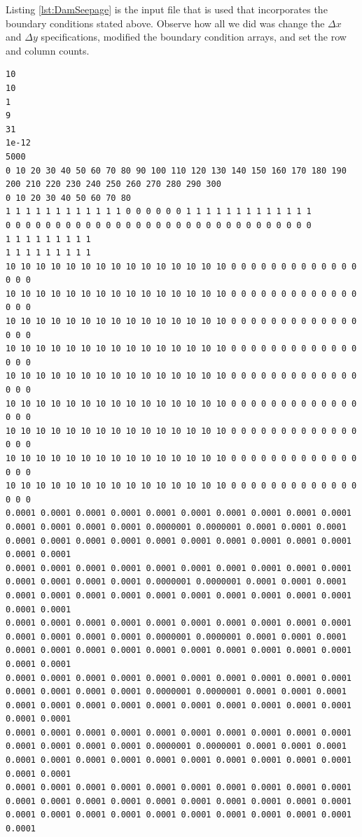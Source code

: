 Listing \ref{lst:DamSeepage} is the input file that is used that incorporates the boundary conditions stated above.   
Observe how all we did was change the $\Delta x$ and $\Delta y$ specifications, modified the boundary condition arrays, and set the row and column counts.
\begin{lstlisting}[caption= Input file for 2D vertical slice for Dam Seepage Example , label=lst:DamSeepage]
10
10
1
9
31
1e-12
5000
0 10 20 30 40 50 60 70 80 90 100 110 120 130 140 150 160 170 180 190 200 210 220 230 240 250 260 270 280 290 300
0 10 20 30 40 50 60 70 80
1 1 1 1 1 1 1 1 1 1 1 1 0 0 0 0 0 0 1 1 1 1 1 1 1 1 1 1 1 1 1 
0 0 0 0 0 0 0 0 0 0 0 0 0 0 0 0 0 0 0 0 0 0 0 0 0 0 0 0 0 0 0 
1 1 1 1 1 1 1 1 1 
1 1 1 1 1 1 1 1 1 
10 10 10 10 10 10 10 10 10 10 10 10 10 10 10 0 0 0 0 0 0 0 0 0 0 0 0 0 0 0 0
10 10 10 10 10 10 10 10 10 10 10 10 10 10 10 0 0 0 0 0 0 0 0 0 0 0 0 0 0 0 0
10 10 10 10 10 10 10 10 10 10 10 10 10 10 10 0 0 0 0 0 0 0 0 0 0 0 0 0 0 0 0
10 10 10 10 10 10 10 10 10 10 10 10 10 10 10 0 0 0 0 0 0 0 0 0 0 0 0 0 0 0 0
10 10 10 10 10 10 10 10 10 10 10 10 10 10 10 0 0 0 0 0 0 0 0 0 0 0 0 0 0 0 0
10 10 10 10 10 10 10 10 10 10 10 10 10 10 10 0 0 0 0 0 0 0 0 0 0 0 0 0 0 0 0
10 10 10 10 10 10 10 10 10 10 10 10 10 10 10 0 0 0 0 0 0 0 0 0 0 0 0 0 0 0 0
10 10 10 10 10 10 10 10 10 10 10 10 10 10 10 0 0 0 0 0 0 0 0 0 0 0 0 0 0 0 0
10 10 10 10 10 10 10 10 10 10 10 10 10 10 10 0 0 0 0 0 0 0 0 0 0 0 0 0 0 0 0
0.0001 0.0001 0.0001 0.0001 0.0001 0.0001 0.0001 0.0001 0.0001 0.0001 0.0001 0.0001 0.0001 0.0001 0.0000001 0.0000001 0.0001 0.0001 0.0001 0.0001 0.0001 0.0001 0.0001 0.0001 0.0001 0.0001 0.0001 0.0001 0.0001 0.0001 0.0001
0.0001 0.0001 0.0001 0.0001 0.0001 0.0001 0.0001 0.0001 0.0001 0.0001 0.0001 0.0001 0.0001 0.0001 0.0000001 0.0000001 0.0001 0.0001 0.0001 0.0001 0.0001 0.0001 0.0001 0.0001 0.0001 0.0001 0.0001 0.0001 0.0001 0.0001 0.0001
0.0001 0.0001 0.0001 0.0001 0.0001 0.0001 0.0001 0.0001 0.0001 0.0001 0.0001 0.0001 0.0001 0.0001 0.0000001 0.0000001 0.0001 0.0001 0.0001 0.0001 0.0001 0.0001 0.0001 0.0001 0.0001 0.0001 0.0001 0.0001 0.0001 0.0001 0.0001
0.0001 0.0001 0.0001 0.0001 0.0001 0.0001 0.0001 0.0001 0.0001 0.0001 0.0001 0.0001 0.0001 0.0001 0.0000001 0.0000001 0.0001 0.0001 0.0001 0.0001 0.0001 0.0001 0.0001 0.0001 0.0001 0.0001 0.0001 0.0001 0.0001 0.0001 0.0001
0.0001 0.0001 0.0001 0.0001 0.0001 0.0001 0.0001 0.0001 0.0001 0.0001 0.0001 0.0001 0.0001 0.0001 0.0000001 0.0000001 0.0001 0.0001 0.0001 0.0001 0.0001 0.0001 0.0001 0.0001 0.0001 0.0001 0.0001 0.0001 0.0001 0.0001 0.0001
0.0001 0.0001 0.0001 0.0001 0.0001 0.0001 0.0001 0.0001 0.0001 0.0001 0.0001 0.0001 0.0001 0.0001 0.0001 0.0001 0.0001 0.0001 0.0001 0.0001 0.0001 0.0001 0.0001 0.0001 0.0001 0.0001 0.0001 0.0001 0.0001 0.0001 0.0001

\end{lstlisting}
